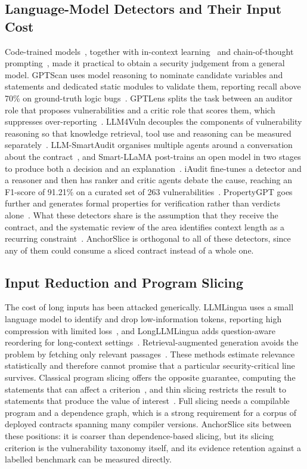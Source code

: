 \documentclass{ieeeaccess}
\begin{document}
\subsection{Language-Model Detectors and Their Input Cost}\label{subsec:rw_model}
Code-trained models~\cite{chen2021codex}, together with in-context learning~\cite{brown2020} and chain-of-thought prompting~\cite{wei2022cot}, made it practical to obtain a security judgement from a general model. GPTScan uses model reasoning to nominate candidate variables and statements and dedicated static modules to validate them, reporting recall above 70\% on ground-truth logic bugs~\cite{sun2024gptscan}. GPTLens splits the task between an auditor role that proposes vulnerabilities and a critic role that scores them, which suppresses over-reporting~\cite{hu2023gptlens}. LLM4Vuln decouples the components of vulnerability reasoning so that knowledge retrieval, tool use and reasoning can be measured separately~\cite{sun2024llm4vuln}. LLM-SmartAudit organises multiple agents around a conversation about the contract~\cite{wei2024smartaudit}, and Smart-LLaMA post-trains an open model in two stages to produce both a decision and an explanation~\cite{yu2024smartllama}. iAudit fine-tunes a detector and a reasoner and then has ranker and critic agents debate the cause, reaching an F1-score of 91.21\% on a curated set of 263 vulnerabilities~\cite{ma2025iaudit}. PropertyGPT goes further and generates formal properties for verification rather than verdicts alone~\cite{liu2025propertygpt}. What these detectors share is the assumption that they receive the contract, and the systematic review of the area identifies context length as a recurring constraint~\cite{he2024review}. AnchorSlice is orthogonal to all of these detectors, since any of them could consume a sliced contract instead of a whole one.

\subsection{Input Reduction and Program Slicing}\label{subsec:rw_reduction}
The cost of long inputs has been attacked generically. LLMLingua uses a small language model to identify and drop low-information tokens, reporting high compression with limited loss~\cite{jiang2023llmlingua}, and LongLLMLingua adds question-aware reordering for long-context settings~\cite{jiang2024longllmlingua}. Retrieval-augmented generation avoids the problem by fetching only relevant passages~\cite{lewis2020rag}. These methods estimate relevance statistically and therefore cannot promise that a particular security-critical line survives. Classical program slicing offers the opposite guarantee, computing the statements that can affect a criterion~\cite{weiser1981}, and thin slicing restricts the result to statements that produce the value of interest~\cite{sridharan2007}. Full slicing needs a compilable program and a dependence graph, which is a strong requirement for a corpus of deployed contracts spanning many compiler versions. AnchorSlice sits between these positions: it is coarser than dependence-based slicing, but its slicing criterion is the vulnerability taxonomy itself, and its evidence retention against a labelled benchmark can be measured directly.
\end{document}
